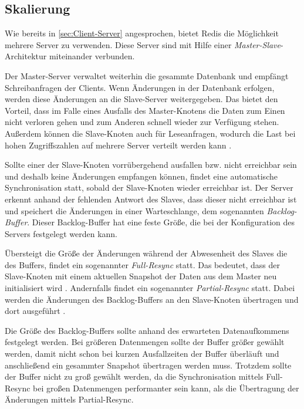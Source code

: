 
\subsection{Skalierung}
\label{sec:Skalierung}
Wie bereits in \autoref{sec:Client-Server} angesprochen, bietet Redis die Möglichkeit mehrere Server zu verwenden.
Diese Server sind mit Hilfe einer \textit{Master-Slave}-Architektur miteinander verbunden.

Der Master-Server verwaltet weiterhin die gesammte Datenbank und empfängt Schreibanfragen der Clients.
Wenn Änderungen in der Datenbank erfolgen, werden diese Änderungen an die Slave-Server weitergegeben.
Das bietet den Vorteil, dass im Falle eines Ausfalls des Master-Knotens die Daten zum Einen nicht verloren gehen und zum Anderen schnell wieder zur Verfügung stehen.
Außerdem können die Slave-Knoten auch für Leseanfragen, wodurch die Last bei hohen Zugriffszahlen auf mehrere Server verteilt werden kann \cite[141]{Huang2018}.

Sollte einer der Slave-Knoten vorrübergehend ausfallen bzw. nicht erreichbar sein und deshalb keine Änderungen empfangen können, findet eine automatische Synchronisation statt, sobald der Slave-Knoten wieder erreichbar ist.
Der Server erkennt anhand der fehlenden Antwort des Slaves, dass dieser nicht erreichbar ist und speichert die Änderungen in einer Warteschlange, dem sogenannten \textit{Backlog-Buffer}. 
Dieser Backlog-Buffer hat eine feste Größe, die bei der Konfiguration des Servers festgelegt werden kann. 

Übersteigt die Größe der Änderungen während der Abwesenheit des Slaves die des Buffers, findet ein sogenannter \textit{Full-Resync} statt.
Das bedeutet, dass der Slave-Knoten mit einem aktuellen Snapshot der Daten aus dem Master neu initialisiert wird \cite{Redis-Docs-Management-Replication}.
Andernfalls findet ein sogenannter \textit{Partial-Resync} statt. Dabei werden die Änderungen des Backlog-Buffers an den Slave-Knoten übertragen und dort ausgeführt \cite[146 - 153]{Huang2018}.

Die Größe des Backlog-Buffers sollte anhand des erwarteten Datenaufkommens festgelegt werden. 
Bei größeren Datenmengen sollte der Buffer größer gewählt werden, damit nicht schon bei kurzen Ausfallzeiten der Buffer überläuft und anschließend ein gesammter Snapshot übertragen werden muss.
Trotzdem sollte der Buffer nicht zu groß gewählt werden, da die Synchronisation mittels Full-Resync bei großen Datenmengen performanter sein kann, als die Übertragung der Änderungen mittels Partial-Resync.




